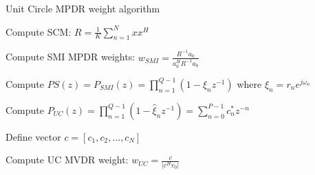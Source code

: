 \documentclass[12pt]{article}
\begin{document}
\begin{algorithm}
\caption{Unit Circle MPDR weight algorithm}


Compute SCM: $R = \frac{1}{K} \sum_{n=1}^{N} xx^H$\;

Compute SMI MPDR weights: $w_{SMI} = \frac{R^{-1}a_0}{a_0^H R^{-1} a_0}$\;

Compute $PS(z) = P_{SMI}(z) = \prod_{n=1}^{Q-1} (1 - \xi_n z^{-1})$ where $\xi_n = r_n e^{j\omega_n}$\;


Compute $P_{UC}(z) = \prod_{n=1}^{Q-1} (1 - \hat{\xi}_n z^{-1}) = \sum_{n=0}^{P-1} c^*_n z^{-n}$\;

Define vector $c = [c_1, c_2, \ldots, c_N]$\;

Compute UC MVDR weight: $w_{UC} = \frac{c}{|c^H v_0|}$\;
\label{alg:uc}
\end{algorithm}
\end{document}
